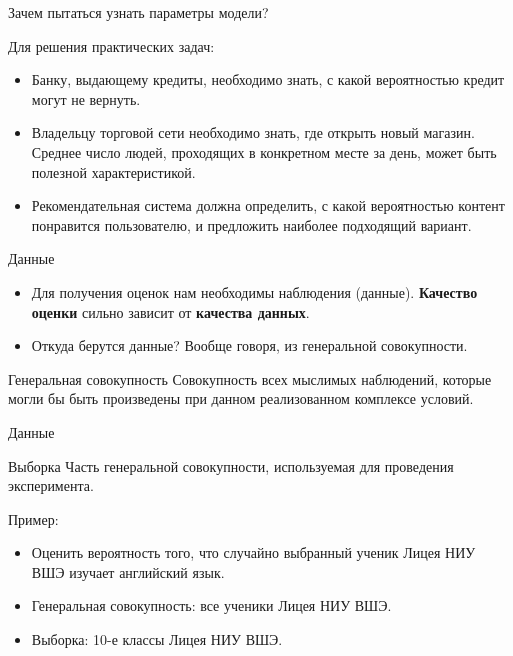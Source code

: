 \documentclass[c, handout]{beamer} %
\begin{document}
	\begin{frame}{Зачем пытаться узнать параметры модели?}
	
	Для решения практических задач:
			\begin{itemize}\setlength\itemsep{1em}
					\item Банку, выдающему кредиты, необходимо знать, с какой вероятностью кредит могут не вернуть.
					\item Владельцу торговой сети необходимо знать, где открыть новый магазин. Среднее число людей, проходящих в конкретном месте за день, может быть полезной характеристикой. 
					\item Рекомендательная система должна определить, с какой вероятностью контент понравится пользователю, и предложить наиболее подходящий вариант. 
			\end{itemize}
	\end{frame}
	
	\begin{frame}{Данные}
		\begin{itemize}\setlength\itemsep{1em}
			\item Для получения оценок нам необходимы наблюдения (данные). \textbf{Качество оценки} сильно зависит от \textbf{качества данных}.  
			\item Откуда берутся данные? Вообще говоря, из генеральной совокупности.
		\end{itemize}
		\begin{block}{Генеральная совокупность}
			Совокупность всех мыслимых наблюдений, которые могли бы быть произведены при данном реализованном комплексе условий. 
		\end{block}
	\end{frame}

	\begin{frame}{Данные}
			\begin{block}{Выборка}
				Часть генеральной совокупности, используемая для проведения эксперимента.
			\end{block}
			Пример:
			\begin{itemize}\setlength\itemsep{1em}
				\item Оценить вероятность того, что случайно выбранный ученик Лицея НИУ ВШЭ изучает английский язык.
				\item<2-> Генеральная совокупность: все ученики Лицея НИУ ВШЭ.
				\item<3-> Выборка: 10-е классы Лицея НИУ ВШЭ.
			\end{itemize}
			
			
	\end{frame}
\end{document}
